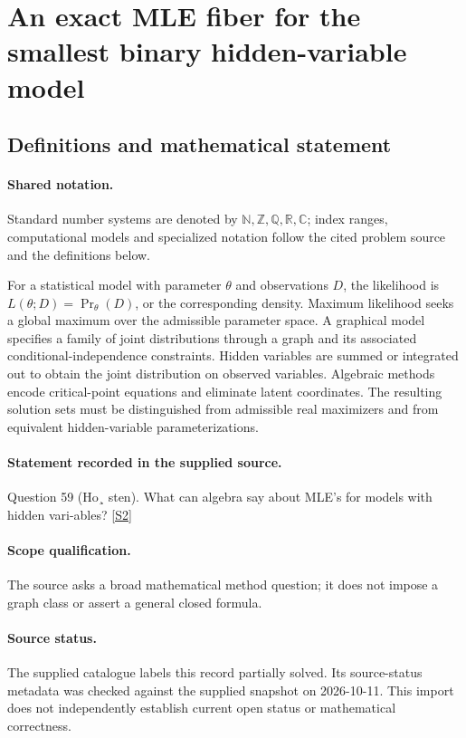 \documentclass[11pt]{article}
\newcommand{\sref}[2]{\hyperlink{source:#1:#2}{[S#2]}}
\begin{document}
\section{An exact MLE fiber for the smallest binary hidden-variable model}\label{statement}

\subsection{Definitions and mathematical statement}

\paragraph{Shared notation.}Standard number systems are denoted by $\mathbb N,\mathbb Z,\mathbb Q,\mathbb R,\mathbb C$; index ranges, computational models and specialized notation follow the cited problem source and the definitions below.


For a statistical model with parameter $\theta$ and observations $D$, the likelihood is $L(\theta;D)=\Pr_\theta(D)$, or the corresponding density. Maximum likelihood seeks a global maximum over the admissible parameter space. A graphical model specifies a family of joint distributions through a graph and its associated conditional-independence constraints. Hidden variables are summed or integrated out to obtain the joint distribution on observed variables. Algebraic methods encode critical-point equations and eliminate latent coordinates. The resulting solution sets must be distinguished from admissible real maximizers and from equivalent hidden-variable parameterizations.
\paragraph{Statement recorded in the supplied source.}
Question 59 (Ho¸ sten). What can algebra say about MLE's for models with hidden vari-ables? \sref{statement}{2}
\paragraph{Scope qualification.}
The source asks a broad mathematical method question; it does not impose a graph class or assert a general closed formula.
\paragraph{Source status.}
The supplied catalogue labels this record partially solved. Its source-status metadata was checked against the supplied snapshot on 2026-10-11. This import does not independently establish current open status or mathematical correctness.
\end{document}
